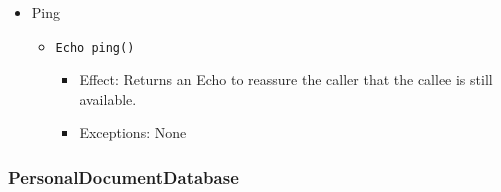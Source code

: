\documentclass[a4paper,10pt]{article}
\begin{document}
\begin{itemize}
    \item Ping
    \begin{itemize}
    	\item \texttt{Echo ping()}
    	\begin{itemize}
    		\item Effect: Returns an Echo to reassure the caller that the callee is still available.
    		\item Exceptions: None
    	\end{itemize}
    \end{itemize}
\end{itemize}

\subsubsection*{PersonalDocumentDatabase}
\end{document}
